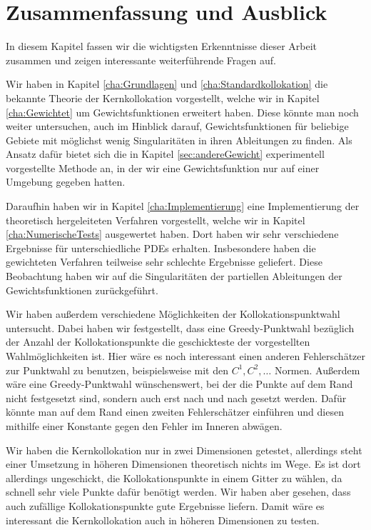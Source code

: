 \chapter{Zusammenfassung und Ausblick}
\label{cha:schluss}

In diesem Kapitel fassen wir die wichtigsten Erkenntnisse dieser Arbeit zusammen und zeigen interessante weiterführende Fragen auf.

Wir haben in Kapitel \ref{cha:Grundlagen} und \ref{cha:Standardkollokation} die bekannte Theorie der Kernkollokation vorgestellt, welche wir in Kapitel \ref{cha:Gewichtet} um Gewichtsfunktionen erweitert haben. Diese könnte man noch weiter untersuchen, auch im Hinblick darauf, Gewichtsfunktionen für beliebige Gebiete mit möglichst wenig Singularitäten in ihren Ableitungen zu finden. Als Ansatz dafür bietet sich die in Kapitel \ref{sec:andereGewicht} experimentell vorgestellte Methode an, in der wir eine Gewichtsfunktion nur auf einer Umgebung gegeben hatten.

Daraufhin haben wir in Kapitel \ref{cha:Implementierung} eine Implementierung der theoretisch hergeleiteten Verfahren vorgestellt, welche wir in Kapitel \ref{cha:NumerischeTests} ausgewertet haben. Dort haben wir sehr verschiedene Ergebnisse für unterschiedliche \acp{PDE} erhalten. Insbesondere haben die gewichteten Verfahren teilweise sehr schlechte Ergebnisse geliefert. Diese Beobachtung haben wir auf die Singularitäten der partiellen Ableitungen der Gewichtsfunktionen zurückgeführt.

Wir haben außerdem verschiedene Möglichkeiten der Kollokationspunktwahl untersucht. Dabei haben wir festgestellt, dass eine Greedy-Punktwahl bezüglich der Anzahl der Kollokationspunkte die geschickteste der vorgestellten Wahlmöglichkeiten ist. Hier wäre es noch interessant einen anderen Fehlerschätzer zur Punktwahl zu benutzen, beispielsweise mit den $C^1, C^2, \dots$ Normen. Außerdem wäre eine Greedy-Punktwahl wünschenswert, bei der die Punkte auf dem Rand nicht festgesetzt sind, sondern auch erst nach und nach gesetzt werden. Dafür könnte man auf dem Rand einen zweiten Fehlerschätzer einführen und diesen mithilfe einer Konstante gegen den Fehler im Inneren abwägen.

Wir haben die Kernkollokation nur in zwei Dimensionen getestet, allerdings steht einer Umsetzung in höheren Dimensionen theoretisch nichts im Wege. Es ist dort allerdings ungeschickt, die Kollokationspunkte in einem Gitter zu wählen, da schnell sehr viele Punkte dafür benötigt werden. Wir haben aber gesehen, dass auch zufällige Kollokationspunkte gute Ergebnisse liefern. Damit wäre es interessant die Kernkollokation auch in höheren Dimensionen zu testen.